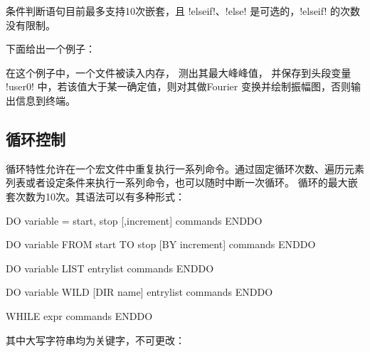 条件判断语句目前最多支持10次嵌套，且 !elseif!、!else!
是可选的，!elseif! 的次数没有限制。

下面给出一个例子：
在这个例子中，一个文件被读入内存， 测出其最大峰峰值，
并保存到头段变量 !user0! 中，若该值大于某一确定值，则对其做Fourier
变换并绘制振幅图，否则输出信息到终端。

\subsection{循环控制}
循环特性允许在一个宏文件中重复执行一系列命令。通过固定循环次数、遍历元素
列表或者设定条件来执行一系列命令，也可以随时中断一次循环。
循环的最大嵌套次数为10次。其语法可以有多种形式：
\begin{SACCode}
DO variable = start, stop [,increment]
    commands
ENDDO
\end{SACCode}

\begin{SACCode}
DO variable FROM start TO stop [BY increment]
    commands
ENDDO
\end{SACCode}

\begin{SACCode}
DO variable LIST entrylist
    commands
ENDDO
\end{SACCode}

\begin{SACCode}
DO variable WILD [DIR name] entrylist
    commands
ENDDO
\end{SACCode}

\begin{SACCode}
WHILE expr
    commands
ENDDO
\end{SACCode}
其中大写字符串均为关键字，不可更改：

